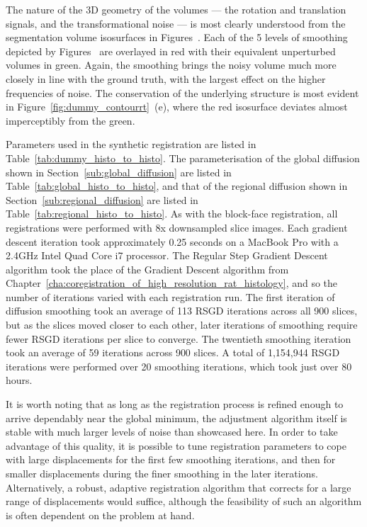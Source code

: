   The nature of the 3D geometry of the volumes --- the rotation and translation signals, and the transformational noise --- is most clearly understood from the segmentation volume isosurfaces in Figures~. Each of the 5 levels of smoothing depicted by Figures~ are overlayed in red with their equivalent unperturbed volumes in green. Again, the smoothing brings the noisy volume much more closely in line with the ground truth, with the largest effect on the higher frequencies of noise. The conservation of the underlying structure is most evident in Figure~\ref{fig:dummy_contourrt}~(e), where the red isosurface deviates almost imperceptibly from the green.
  
  Parameters used in the synthetic registration are listed in Table~\ref{tab:dummy_histo_to_histo}. The parameterisation of the global diffusion shown in Section~\ref{sub:global_diffusion} are listed in Table~\ref{tab:global_histo_to_histo}, and that of the regional diffusion shown in Section~\ref{sub:regional_diffusion} are listed in Table~\ref{tab:regional_histo_to_histo}. As with the block-face registration, all registrations were performed with 8x downsampled slice images. Each gradient descent iteration took approximately 0.25 seconds on a MacBook Pro with a 2.4GHz Intel Quad Core i7 processor. The Regular Step Gradient Descent algorithm took the place of the Gradient Descent algorithm from Chapter~\ref{cha:coregistration_of_high_resolution_rat_histology}, and so the number of iterations varied with each registration run. The first iteration of diffusion smoothing took an average of 113 RSGD iterations across all 900 slices, but as the slices moved closer to each other, later iterations of smoothing require fewer RSGD iterations per slice to converge. The twentieth smoothing iteration took an average of 59 iterations across 900 slices. A total of 1,154,944 RSGD iterations were performed over 20 smoothing iterations, which took just over 80 hours.
  
  It is worth noting that as long as the registration process is refined enough to arrive dependably near the global minimum, the adjustment algorithm itself is stable with much larger levels of noise than showcased here. In order to take advantage of this quality, it is possible to tune registration parameters to cope with large displacements for the first few smoothing iterations, and then for smaller displacements during the finer smoothing in the later iterations. Alternatively, a robust, adaptive registration algorithm that corrects for a large range of displacements would suffice, although the feasibility of such an algorithm is often dependent on the problem at hand.

